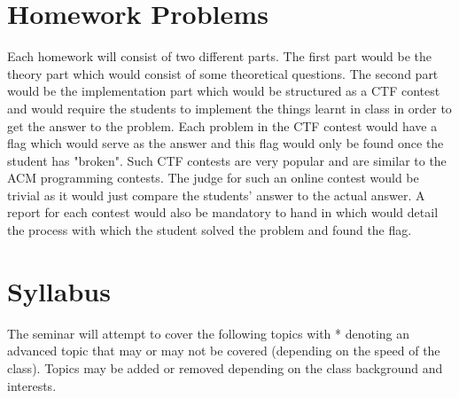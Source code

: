\documentclass[11pt]{article}
\begin{document}
\section{Homework Problems}

Each homework will consist of two different parts. The first part would be the theory part which would consist of some theoretical questions. The second part would be the implementation part which would be structured as a CTF contest and would require the students to implement the things learnt in class in order to get the answer to the problem. Each problem in the CTF contest would have a flag which would serve as the answer and this flag would only be found once the student has "broken". Such CTF contests are very popular and are similar to the ACM programming contests. The judge for such an online contest would be trivial as it would just compare the students' answer to the actual answer. A report for each contest would also be mandatory to hand in which would detail the process with which the student solved the problem and found the flag.

\section{Syllabus}

The seminar will attempt to cover the following topics with * denoting an advanced topic that may or may not be covered (depending on the speed of the class). Topics may be added or removed depending on the class background and interests.
\end{document}
